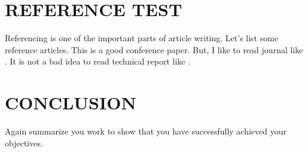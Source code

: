 \documentclass[conference]{IEEEtran}
\begin{document}
\section{REFERENCE TEST}
Referencing is one of the important parts of article writing. Let’s list some reference articles. This is \cite{Blum2005} a good conference paper. But, I like to read journal like \cite{Samarati:2001:PRI:627337.628183}. It is not a bad idea to read technical report like \cite{Li2011}.

\section{CONCLUSION}
Again summarize you work to show that you have successfully
achieved your objectives.

 

\end{document}

